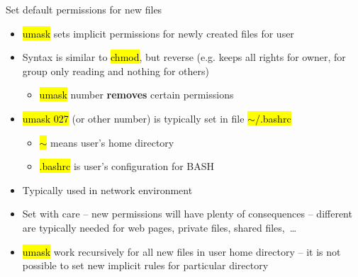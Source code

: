 \documentclass[compress, ucs, xelatex, 11pt, xcolor=svgnames,
  hyperref={
    bookmarks=true,
    unicode=true,
    colorlinks=true,
    pdftitle={Linux, command line and MetaCentrum},
    plainpages=false,
    pdfauthor={Vojtech Zeisek},
    pdfsubject={Course about use of Linux command line, writing shell scripts and using MetaCentrum of CESNET},
    pdfcreator={XeLaTeX},
    pdfkeywords={Linux, GNU, BASH, shell, command line, MetaCentrum},
    linkcolor=DarkRed,
    anchorcolor=DarkBlue,
    citecolor=Indigo,
    filecolor=NavyBlue,
    menucolor=DarkMagenta,
    urlcolor=DarkBlue,
    pdftex},
  url={hyphens, lowtilde} %
  ]{beamer}
\renewcommand{\texttt}[1]{\hl{\ttfamily #1}}
\begin{document}
\begin{frame}{Set default permissions for new files}
  \begin{itemize}
    \item \texttt{umask} sets implicit permissions for newly created files for user
    \item Syntax is similar to \texttt{chmod}, but reverse (e.g. \texttt{027} keeps all rights for owner, for group only reading and nothing for others)
    \begin{itemize}
      \item \texttt{umask} number \textbf{removes} certain permissions
    \end{itemize}
    \item \texttt{umask 027} (or other number) is typically set in file \texttt{$\sim$/.bashrc}
    \begin{itemize}
      \item \texttt{$\sim$} means user's home directory
      \item \texttt{.bashrc} is user's configuration for BASH
    \end{itemize}
    \item Typically used in network environment
    \item Set with care -- new permissions will have plenty of consequences -- different are typically needed for web pages, private files, shared files,~\ldots
    \item \texttt{umask} work recursively for all new files in user home directory -- it is not possible to set new implicit rules for particular directory
  \end{itemize}
\end{frame}
\end{document}
